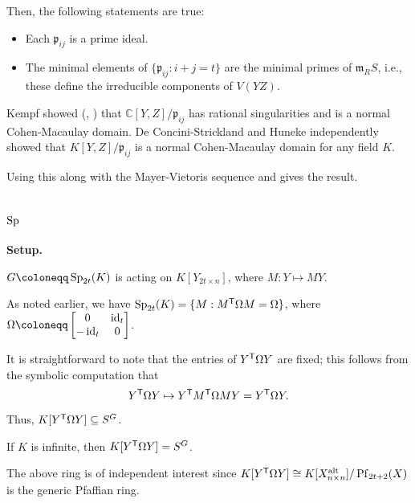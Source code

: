 \documentclass[12pt]{article}
\begin{document}
Then, the following statements are true:
\begin{itemize}
	\item Each $\mathfrak{p}_{ij}$ is a prime ideal.
	\item The minimal elements of $\{\mathfrak{p}_{ij} : i + j = t\}$ are the minimal primes of $\mathfrak{m}_{R}S$, i.e., these define the irreducible components of $V(YZ)$.
\end{itemize}

Kempf showed (\cite{KempfImagesHomogeneousVectorBundles}, \cite{KempfCollapsingHomogeneousBundles}) that $\mathbb{C}[Y, Z]/\mathfrak{p}_{ij}$ has rational singularities and is a normal Cohen-Macaulay domain. De Concini-Strickland \cite[Theorem 2.7]{DeConciniStrickland} and Huneke \cite[Theorem 6.2]{HunekeArithmeticPerfectionBEVarieties} independently showed that $K[Y, Z]/\mathfrak{p}_{ij}$ is a normal Cohen-Macaulay domain for any field $K$. 

Using this along with the Mayer-Vietoris sequence and  gives the result.

\section{\texorpdfstring{$\operatorname{Sp}$}{Sp}}

\begin{tcolorbox}[parbox=false]
	\textbf{Setup.} 

	$G \coloneqq \Sp_{2t}(K)$ is acting on $K[Y_{2t \times n}]$, where $M : Y \mapsto MY$.
\end{tcolorbox}

As noted earlier, we have $\operatorname{Sp}_{2t}(K) = \{M : M^{\mathsf{T}} \Omega M = \Omega\}$, where $\Omega \coloneqq \two{0}{\id_{t}}{-\id_{t}}{0}$. 

It is straightforward to note that the entries of $Y^{\mathsf{T}} \Omega Y$ are fixed; this follows from the symbolic computation that
\begin{equation*} 
	Y^{\mathsf{T}} \Omega Y \mapsto Y^{\mathsf{T}} M^{\mathsf{T}} \Omega M Y = Y^{\mathsf{T}} \Omega Y. 
\end{equation*}

Thus, $K[Y^{\mathsf{T}} \Omega Y] \subseteq S^{G}$.	

\begin{thm}
	If $K$ is infinite, then $K[Y^{\mathsf{T}} \Omega Y] = S^{G}$.	
\end{thm}

The above ring is of independent interest since $K[Y^{\mathsf{T}} \Omega Y] \cong K[X_{n \times n}^{\text{alt}}]/\operatorname{Pf}_{2t + 2}(X)$ is the generic Pfaffian ring.
\end{document}
